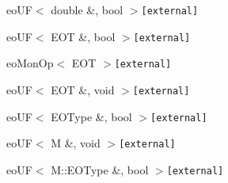 \begin{CompactList}
\begin{CompactList}
\begin{CompactList}
\begin{CompactList}
\item {}
\item {}
\item {}
\end{CompactList}
\end{CompactList}
\item eoUF$<$ double \&, bool $>${\tt  [external]}\begin{CompactList}
\item {}
\begin{CompactList}
\item {}
\item {}
\end{CompactList}
\end{CompactList}
\item eoUF$<$ EOT \&, bool $>${\tt  [external]}\begin{CompactList}
\item eoMonOp$<$ EOT $>${\tt  [external]}\begin{CompactList}
\item {}
\end{CompactList}
\end{CompactList}
\item eoUF$<$ EOT \&, void $>${\tt  [external]}\begin{CompactList}
\item {}
\end{CompactList}
\item eoUF$<$ EOType \&, bool $>${\tt  [external]}\item eoUF$<$ M \&, void $>${\tt  [external]}\begin{CompactList}
\item {}
\end{CompactList}
\item eoUF$<$ M::EOType \&, bool $>${\tt  [external]}\begin{CompactList}

\end{CompactList}
\end{CompactList}
\end{CompactList}
